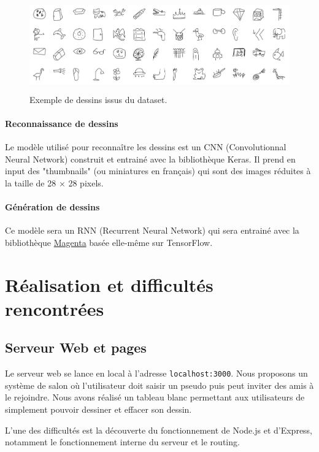 \documentclass{article}
\begin{document}
\begin{figure}[h]
\hrulefill
\begin{center}
\includegraphics[height=150px,width=450px]{preview.jpg}
\end{center}
\caption{Exemple de dessins issus du dataset.}
\hrulefill
\end{figure}

\paragraph{Reconnaissance de dessins} Le modèle utilisé pour reconnaître les dessins est un CNN (Convolutionnal Neural Network) construit et entrainé avec la bibliothèque Keras. Il prend en input des "thumbnails" (ou miniatures en français) qui sont des images réduites à la taille de 28 × 28 pixels. 

\paragraph{Génération de dessins} Ce modèle sera un RNN (Recurrent Neural Network) qui sera entrainé avec la bibliothèque \href{https://magenta.tensorflow.org/}{Magenta} basée elle-même sur TensorFlow.

\section{Réalisation et difficultés rencontrées}

\subsection{Serveur Web et pages}

Le serveur web se lance en local à l'adresse {\tt localhost:3000}. Nous proposons un système de salon où l'utilisateur doit saisir un pseudo puis peut inviter des amis à le rejoindre. Nous avons réalisé un tableau blanc permettant aux utilisateurs de simplement pouvoir dessiner et effacer son dessin.

L'une des difficultés est la découverte du fonctionnement de Node.js et d'Express, notamment le fonctionnement interne du serveur et le routing.
\end{document}
